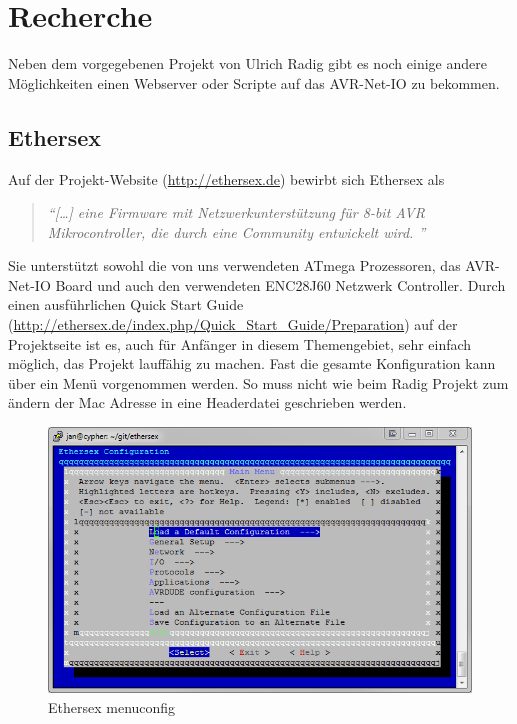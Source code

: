 \chapter{Recherche}

Neben dem vorgegebenen Projekt von Ulrich Radig gibt es noch einige andere
Möglichkeiten einen Webserver oder Scripte auf das AVR-Net-IO zu bekommen.

\section{Ethersex}

Auf der Projekt-Website (\url{http://ethersex.de}) bewirbt sich Ethersex als
\begin{quote} \textit{
		\enquote{[\ldots] eine Firmware mit Netzwerkunterstützung für 8-bit AVR
		Mikrocontroller, die durch eine Community entwickelt wird.  }
	}
	\cite{Ethersex}
\end{quote}

Sie unterstützt sowohl die von uns verwendeten ATmega Prozessoren, das
AVR-Net-IO Board und auch den verwendeten ENC28J60 Netzwerk Controller.
Durch einen ausführlichen Quick Start Guide
(\url{http://ethersex.de/index.php/Quick_Start_Guide/Preparation}) auf der
Projektseite ist es, auch für Anfänger in diesem Themengebiet, sehr einfach möglich, das Projekt lauffähig zu machen. 
Fast die gesamte Konfiguration kann über ein Menü vorgenommen werden. So muss nicht wie beim Radig Projekt zum
ändern der Mac Adresse in eine Headerdatei geschrieben werden. 

\begin{figure}[H]
	\centering
		\includegraphics[width=13cm]{content/pictures/Recherche/Ethersex/Ehtersex1.png}
	\caption{Ethersex menuconfig}
	\label{Ethersex1}
\end{figure} 

